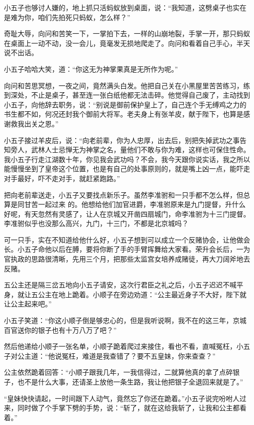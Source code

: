 小五子也够讨人嫌的，地上抓只活蚂蚁放到桌面，说：“我知道，这劈桌子也实在是难为你，咱们先拍死只蚂蚁，怎么样？”

奇耻大辱，向问和苦笑一下，一掌拍下去，一样的山崩地裂，手掌一开，那只蚂蚁在桌面上一动不动，没一会儿，竟毫发无损地爬走了。向问和看着自己手心，半天说不出话。

小五子哈哈大笑，道：“你这无为神掌果真是无所作为呢。”

向问和苦思冥想，一夜之间，竟然满头白发。他把自己关在小黑屋里苦苦练习，练到深处，不止是桌子，甚至连一张白纸他都无法击碎。他觉得自己废了，主动找到小五子，向他辞去职务，说：“别说是御前保护皇上了，自己连个手无缚鸡之力的书生都不如，何况还封我个御前大将军。老夫身上有张羊皮，献于陛下，也算是感谢救我出关之恩。”

小五子接过羊皮后，说：“向老前辈，你为人忠厚，出去后，别把失掉武功之事告知旁人，武林人士忌惮无为神掌之名，量他们不敢与你为难，这样也可保住性命。我小五子行走江湖数十年，你见我会武功吗？不会，我今天跟你说实话，我之所以能慢慢坐到了皇帝这个位置，也是有自己的处事原则的，就是嘴上凶一点，能吓走对手最好，吓不走对手，就赶紧跑路。”

把向老前辈送走，小五子又要找点新乐子。虽然李准驸和一只手都不怎么样，但总算是同甘苦一起过来
的。他想给他们加官进爵，李准驸原来是九门提督，升什么好呢，有天忽然有灵感了，让人在京城又开凿四扇城门，命李准驸为十三门提督。李准驸似乎也没那么高兴，九门，十三门，不都是北京城吗？

可一只手，实在不知道给他什么好，小五子想到可以成立一个反赌协会，让他做会长。小五子命他以后在膊，要将你断了手的手臂挥舞给大家看。荣升会长后，一为官执政的思路很清晰，先用三个月，把那些太监宫女培养成赌徒，再大刀阔斧地去反赌。

五公主还是隔三岔五地向小五子请安，这次行君臣之礼之后，小五子迟迟不喊平身，就让五公主在地上跪着。小顺子在旁边劝道：“公主最近身子不大好，陛下就让公主起来吧。”

小五子笑道：“你这小顺子倒是够忠心的，但是我听说啊，我不在的这三年，京城百官送你的银子也有十万八万了吧？”

然后他递给小顺子一张名单，小顺子跪着爬过来接住，看也不看，直喊冤枉，小五子对公主道：“他说冤枉，难道是我查错了？要不五皇妹，你来查查？”

公主依然跪着回答：“小顺子跟我几年，一我信得过，二就算他真的拿了点碎银子，也不是什么大事，还请圣上放他一条生路，我让他把银子全退回来就是了。”

“皇妹快快请起，一时间跟下人动气，竟然忘了你还在跪着。”小五子说完吩咐人过来，同时做了个手掌下劈的手势，说：“斩了，就在这给我斩了，让我和公主都看着。”

